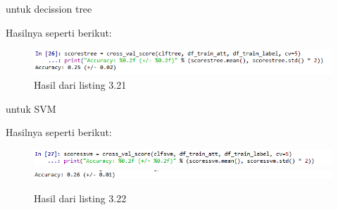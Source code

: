 untuk decission tree

Hasilnya seperti berikut:
\begin{figure}[H]
	\centering
	\includegraphics[width=12cm]{figures/1174083/figures3/30.png}
	\caption{Hasil dari listing 3.21}
\end{figure}

untuk SVM

Hasilnya seperti berikut:
\begin{figure}[H]
	\centering
	\includegraphics[width=12cm]{figures/1174083/figures3/31.png}
	\includegraphics{figures/1174083/figures3/31a.png}
	\caption{Hasil dari listing 3.22}
\end{figure}

